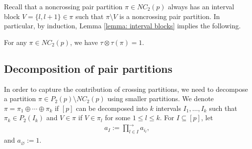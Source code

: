 \documentclass[12pt,reqno]{amsart}
\theoremstyle{plain}
\newcommand{\1}{\mathbf{1}}
\newcommand{\N}{\mathbb{N}}
\begin{document}
Recall that a noncrossing pair partition $\pi \in NC_2(p)$ always has an interval block $V=\{l,l+1\} \in \pi$ such that $\pi\setminus V$ is a noncrossing pair partition. In particular, by induction, Lemma \ref{lemma: interval blocks} implies the following.
\begin{corollary}\label{corollary: contribution of noncrossing partitions}
    For any $\pi \in NC_2(p)$, we have $\tau\otimes \tau(\pi)=1$.
\end{corollary}

\subsection{Decomposition of pair partitions}\label{subsection: graph of crossings}
In order to capture the contribution of crossing partitions, we need to decompose a partition $\pi \in P_2(p)\setminus NC_2(p)$ using smaller partitions. We denote $\pi=\pi_1\oplus \cdots \oplus \pi_k$ if $[p]$ can be decomposed into $k$ intervals $I_1,\ldots,I_k$ such that $\pi_k \in P_2(I_k)$ and $V \in \pi$ if $V \in \pi_l$ for some $1 \le l \le k$. 
For $I \subseteq [p]$, let
\begin{align}\label{equation: notation a_I}
    a_I:=\prod_{l \in I}^{\to}a_{i_l},
\end{align}
and $a_{\varnothing}:=1$.
\end{document}
